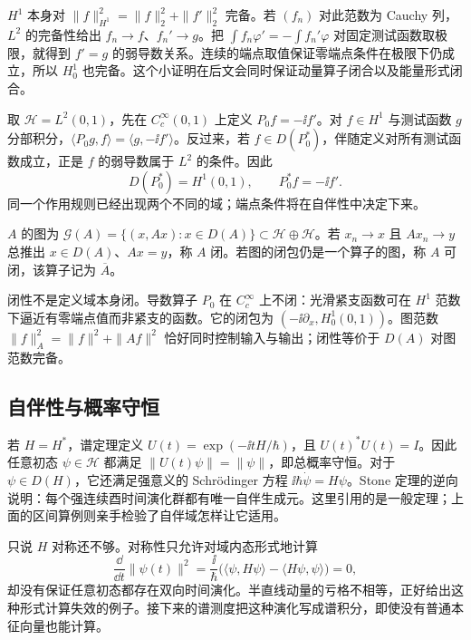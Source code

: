 \(H^1\) 本身对 \(\|f\|_{H^1}^2=\|f\|_2^2+\|f'\|_2^2\) 完备。若 \((f_n)\) 对此范数为 Cauchy 列，\(L^2\) 的完备性给出 \(f_n\to f\)、\(f_n'\to g\)。把 \(\int f_n\varphi'=-\int f_n'\varphi\) 对固定测试函数取极限，就得到 \(f'=g\) 的弱导数关系。连续的端点取值保证零端点条件在极限下仍成立，所以 \(H_0^1\) 也完备。这个小证明在后文会同时保证动量算子闭合以及能量形式闭合。

取 \(\mathcal H=L^2(0,1)\)，先在 \(C_c^\infty(0,1)\) 上定义 \(P_0f=-\ii f'\)。对 \(f\in H^1\) 与测试函数 \(g\) 分部积分，\(\langle P_0g,f\rangle=\langle g,-\ii f'\rangle\)。反过来，若 \(f\in D(P_0^*)\)，伴随定义对所有测试函数成立，正是 \(f\) 的弱导数属于 \(L^2\) 的条件。因此
\[
D(P_0^*)=H^1(0,1),\qquad P_0^*f=-\ii f'.
\]
同一个作用规则已经出现两个不同的域；端点条件将在自伴性中决定下来。

\begin{definition}[闭算子]
\(A\) 的图为 \(\mathcal G(A)=\{(x,Ax):x\in D(A)\}\subset\mathcal H\oplus\mathcal H\)。若 \(x_n\to x\) 且 \(Ax_n\to y\) 总推出 \(x\in D(A)\)、\(Ax=y\)，称 \(A\) 闭。若图的闭包仍是一个算子的图，称 \(A\) 可闭，该算子记为 \(\overline A\)。
\end{definition}

闭性不是定义域本身闭。导数算子 \(P_0\) 在 \(C_c^\infty\) 上不闭：光滑紧支函数可在 \(H^1\) 范数下逼近有零端点值而非紧支的函数。它的闭包为 \((-\ii\partial_x,H_0^1(0,1))\)。图范数 \(\|f\|_A^2=\|f\|^2+\|Af\|^2\) 恰好同时控制输入与输出；闭性等价于 \(D(A)\) 对图范数完备。

\subsection{自伴性与概率守恒}

若 \(H=H^*\)，谱定理定义 \(U(t)=\exp(-\ii tH/\hbar)\)，且 \(U(t)^*U(t)=I\)。因此任意初态 \(\psi\in\mathcal H\) 都满足 \(\|U(t)\psi\|=\|\psi\|\)，即总概率守恒。对于 \(\psi\in D(H)\)，它还满足强意义的 Schrödinger 方程 \(\ii\hbar\dot\psi=H\psi\)。Stone 定理的逆向说明：每个强连续酉时间演化群都有唯一自伴生成元。这里引用的是一般定理；上面的区间算例则亲手检验了自伴域怎样让它适用。

只说 \(H\) 对称还不够。对称性只允许对域内态形式地计算
\[
\frac{\dd}{\dd t}\|\psi(t)\|^2
=\frac{\ii}{\hbar}\bigl(\langle \psi,H\psi\rangle-\langle H\psi,\psi\rangle\bigr)=0,
\]
却没有保证任意初态都存在双向时间演化。半直线动量的亏格不相等，正好给出这种形式计算失效的例子。接下来的谱测度把这种演化写成谱积分，即使没有普通本征向量也能计算。
